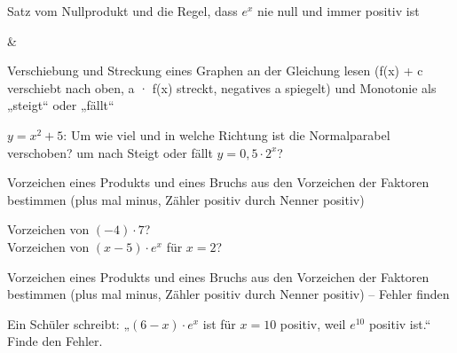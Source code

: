\begin{aufgabe}{Satz vom Nullprodukt und die Regel, dass $e^x$ nie null und immer positiv ist}
\begin{gleichungsraster}[2]
 &
 \\
\end{gleichungsraster}
\end{aufgabe}

\begin{aufgabe}{Verschiebung und Streckung eines Graphen an der Gleichung lesen (f(x) + c verschiebt nach oben, a · f(x) streckt, negatives a spiegelt) und Monotonie als „steigt“ oder „fällt“}
\begin{teile}
\teil $y = x^2 + 5$: Um wie viel und in welche Richtung ist die Normalparabel verschoben? um \leerfeld nach \leerfeld
\teil Steigt oder fällt $y = 0{,}5 \cdot 2^x$?
\end{teile}
\end{aufgabe}

\begin{aufgabe}{Vorzeichen eines Produkts und eines Bruchs aus den Vorzeichen der Faktoren bestimmen (plus mal minus, Zähler positiv durch Nenner positiv)}
\begin{teile}
\teil Vorzeichen von $(-4) \cdot 7$?  \\ 
\teil Vorzeichen von $(x - 5) \cdot e^{x}$ für $x = 2$?  \\ 
\end{teile}
\end{aufgabe}

\begin{aufgabe}{Vorzeichen eines Produkts und eines Bruchs aus den Vorzeichen der Faktoren bestimmen (plus mal minus, Zähler positiv durch Nenner positiv) – Fehler finden}
\begin{teile}
\teil Ein Schüler schreibt: „$(6 - x) \cdot e^{x}$ ist für $x = 10$ positiv, weil $e^{10}$ positiv ist.“ Finde den Fehler.
\end{teile}
\end{aufgabe}


